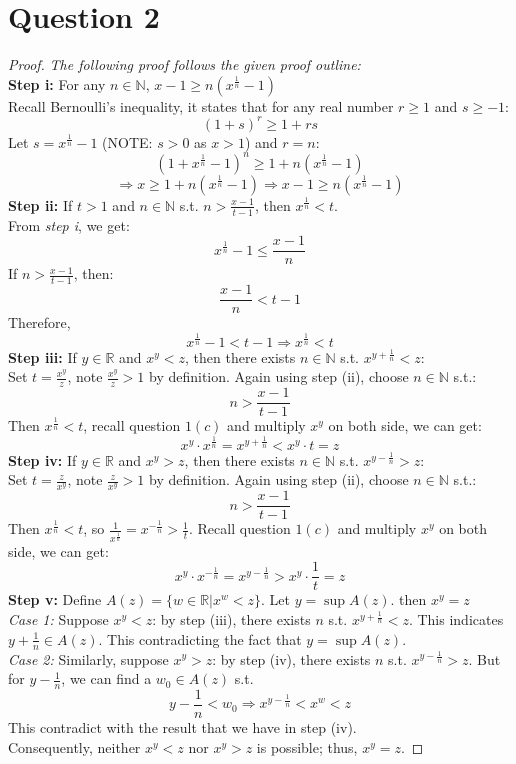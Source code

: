 \documentclass{article}
\begin{document}
\section*{Question 2}
\begin{proof}
    \textit{The following proof follows the given proof outline:}
    \\
    \textbf{Step i:} For any $n \in \mathbb{N}$, $x - 1 \geq n(x^{\frac{1}{n}} - 1)$
    \\
    Recall Bernoulli's inequality, it states that for any real number $r \geq 1$ and $s \geq -1$:
    \[ (1 + s)^r \geq 1 + rs \]
    Let $s = x^{\frac{1}{n}} - 1$ (NOTE: $s > 0$ as $x > 1$) and $r = n$:
    \[ (1 + x^{\frac{1}{n}} - 1)^n \geq 1 + n(x^{\frac{1}{n}} - 1) \]
    \[ \Rightarrow x \geq 1 + n(x^{\frac{1}{n}} - 1) \Rightarrow x - 1 \geq n(x^{\frac{1}{n}} - 1) \]
    \textbf{Step ii:} If $t > 1$ and $n \in \mathbb{N}$ s.t. $n > \frac{x - 1}{t - 1}$, then $x^\frac{1}{n} < t$.
    \\
    From \textit{step i}, we get:
    \[ x^{\frac{1}{n}} - 1 \leq \frac{x - 1}{n} \]
    If $n > \frac{x - 1}{t - 1}$, then:
    \[ \frac{x - 1}{n} < t - 1 \]
    Therefore,
    \[ x^{\frac{1}{n}} - 1 < t - 1 \Longrightarrow x^{\frac{1}{n}} < t \]
    \textbf{Step iii:} If $y \in \mathbb{R}$ and $x^y < z$, then there exists $n \in \mathbb{N}$ s.t. $x^{y + \frac{1}{n}} < z$:
    \\
    Set $t = \frac{x^y}{z}$, note $\frac{x^y}{z} > 1$ by definition. Again using step (ii), choose $n \in \mathbb{N}$ s.t.:
    \[ n > \frac{x - 1}{t - 1} \]
    Then $x^{\frac{1}{n}} < t$, recall question $1(c)$ and multiply $x^y$ on both side, we can get:
    \[ x^y \cdot x^{\frac{1}{n}} = x^{y + \frac{1}{n}}  < x^y \cdot t = z \]
    \textbf{Step iv:} If $y \in \mathbb{R}$ and $x^y > z$, then there exists $n \in \mathbb{N}$ s.t. $x^{y - \frac{1}{n}} > z$:
    \\
    Set $t = \frac{z}{x^y}$, note $\frac{z}{x^y} > 1$ by definition. Again using step (ii), choose $n \in \mathbb{N}$ s.t.:
    \[ n > \frac{x - 1}{t - 1} \]
    Then $x^{\frac{1}{n}} < t$, so $ \frac{1}{x^{\frac{1}{n}}} = x^{-\frac{1}{n}} > \frac{1}{t}$. Recall question $1(c)$ and multiply $x^y$ on both side, we can get:
    \[ x^y \cdot x^{-\frac{1}{n}} = x^{y - \frac{1}{n}} > x^y \cdot \frac{1}{t} = z \]
    \textbf{Step v:} Define $A(z) = \{w \in \mathbb{R} | x^w < z \}$. Let $y = \sup A(z)$. then $x^y = z$
    \\
    \textit{Case 1: }
    Suppose $x^y < z$: by step (iii), there exists $n$ s.t. $x^{y + \frac{1}{n}} < z$. This indicates $y + \frac{1}{n} \in A(z)$.
    This contradicting the fact that $y = \sup A(z)$.
    \\
    \textit{Case 2: }
    Similarly, suppose $x^y > z$: by step (iv), there exists $n$ s.t. $x^{y - \frac{1}{n}} > z$. But for $y - \frac{1}{n}$, we can find a $w_0 \in A(z)$ s.t.
    \[ y - \frac{1}{n} < w_0 \Rightarrow x^{y - \frac{1}{n}} < x^w < z \]
    This contradict with the result that we have in step (iv).
    \\
    Consequently, neither $x^y < z$ nor $x^y > z$ is possible; thus, $x^y = z$.
\end{proof}
\end{document}
